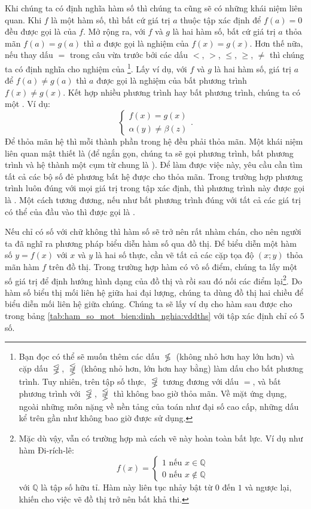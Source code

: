 Khi chúng ta có định nghĩa hàm số thì chúng ta cũng sẽ có những khái niệm liên quan. Khi $f$ là một hàm số, thì bất cứ giá trị $a$ thuộc tập xác định để $f(a) = 0$ đều được gọi là  của $f$. Mở rộng ra, với $f$ và $g$ là hai hàm số, bất cứ giá trị $a$ thỏa mãn $f(a) = g(a)$ thì $a$ được gọi là nghiệm của  $f(x) = g(x)$. Hơn thế nữa, nếu thay dấu $=$ trong câu vừa trước bởi các dấu $<$, $>$, $\leq$, $\geq$, $\neq$ thì chúng ta có định nghĩa cho nghiệm của \footnote{Bạn đọc có thể sẽ muốn thêm các dấu $\not \lessgtr$ (không nhỏ hơn hay lớn hơn) và cặp dấu $\not \lesseqgtr$, $\not \lesseqqgtr$ (không nhỏ hơn, lớn hơn hay bằng) làm dấu cho bất phương trình. Tuy nhiên, trên tập số thực, $\not \lesseqgtr$ tương đương với dấu $=$, và bất phương trình với $\not \lesseqgtr$, $\not \lesseqqgtr$ thì không bao giờ thỏa mãn. Về mặt ứng dụng, ngoài những môn nặng về nền tảng của toán như đại số cao cấp, những dấu kể trên gần như không bao giờ được sử dụng.}. Lấy ví dụ, với $f$ và $g$ là hai hàm số, giá trị $a$ để $f(a) \neq g(a)$ thì $a$ được gọi là nghiệm của bất phương trình $f(x) \neq g(x)$. Kết hợp nhiều phương trình hay bất phương trình, chúng ta có một . Ví dụ:
$$
\begin{cases}
   f(x) = g(x) \\
   \alpha(y) \neq \beta(z)
\end{cases}.
$$
Để thỏa mãn hệ thì mỗi thành phần trong hệ đều phải thỏa mãn. Một khái niệm liên quan mật thiết là  (để ngắn gọn, chúng ta sẽ gọi phương trình, bất phương trình và hệ thành một cụm từ chung là ). Để làm được việc này, yêu cầu cần tìm tất cả các bộ số đẻ phương bất hệ được cho thỏa mãn. Trong trường hợp phương trình luôn đúng với mọi giá trị trong tập xác định, thì phương trình này được gọi là . Một cách tương đương, nếu như bất phương trình đúng với tất cả các giá trị có thể của đầu vào thì được gọi là .

Nếu chỉ có số với chữ không thì hàm số sẽ trở nên rất nhàm chán, cho nên người ta đã nghĩ ra phương pháp biểu diễn hàm số qua đồ thị. Để biểu diễn một hàm số $y=f(x)$ với $x$ và $y$ là hai số thực, cần vẽ tất cả các cặp tọa độ $(x; y)$ thỏa mãn hàm $f$ trên đồ thị. Trong trường hợp hàm có vô số điểm, chúng ta lấy một số giá trị để định hướng hình dạng của đồ thị và rồi sau đó nối các điểm lại\footnote{Mặc dù vậy, vẫn có trường hợp mà cách vẽ này hoàn toàn bất lực. Ví dụ như hàm Đi-rích-lê: $$f(x) =
\begin{cases}
   1 \text{ nếu } x\in \mathbb{Q} \\
   0 \text{ nếu } x\notin \mathbb{Q}
\end{cases}$$ với $\mathbb{Q}$ là tập số hữu tỉ. Hàm này liên tục nhảy bật từ $0$ đến $1$ và ngược lại, khiến cho việc vẽ đồ thị trở nên bất khả thi.}. Do hàm số biểu thị mối liên hệ giữa hai đại lượng, chúng ta dùng đồ thị hai chiều để biểu diễn mối liên hệ giữa chúng. Chúng ta sẽ lấy ví dụ cho hàm sau được cho trong bảng \ref{tab:ham_so_mot_bien:dinh_nghia:vddths} với tập xác định chỉ có $5$ số.

